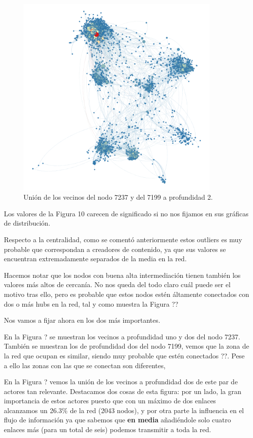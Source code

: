 \begin{figure}[ht]
    \centerfloat
    \includegraphics[width=0.9\textwidth]{img/resultados/grado-vector7199y7237.png}
    \caption{Unión de los vecinos del nodo 7237 y del 7199 a profundidad 2.}
\end{figure}

Los valores de la Figura 10 carecen de significado si no nos fijamos en sus gráficas de distribución.

Respecto a la centralidad, como se comentó anteriormente estos outliers es muy probable que correspondan a creadores de contenido, ya que sus valores se encuentran extremadamente separados de la media en la red.

Hacemos notar que los nodos con buena alta intermediación tienen también los valores más altos de cercanía. No nos queda del todo claro cuál puede ser el motivo tras ello, pero es probable que estos nodos estén áltamente conectados con dos o más hubs en la red, tal y como muestra la  Figura ?? %

\vspace{\baselineskip}

Nos vamos a fijar ahora en los dos más importantes.

En la Figura ? se muestran los vecinos a profundidad uno y dos del nodo 7237.
También se muestran los de profundidad dos del nodo 7199, vemos que la zona de la red que ocupan es similar, siendo muy probable que estén conectados ??. Pese a ello las zonas con las que se conectan son diferentes, 

En la Figura ? vemos la unión de los vecinos a profundidad dos de este par de actores tan relevante. Destacamos dos cosas de esta figura: por un lado, la gran importancia de estos actores puesto que con un máximo de dos enlaces alcanzamos un 26.3\% de la red (2043 nodos), y por otra parte la influencia en el flujo de información ya que sabemos que \textbf{en media} añadiéndole solo cuatro enlaces más (para un total de seis) podemos transmitir a toda la red.